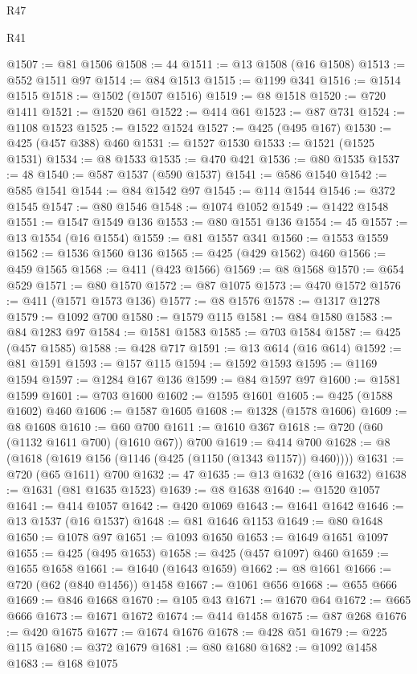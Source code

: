 \begin{lexlean}{R47}
\begin{lexlean}{R41}
\begin{coremodule}
{{{{{{{{{{{{{{{{{{{{{{{{{{{{{{{{{{{{{{{{{{{{{{{{{{{{{{{{{{{{{{{{{{{{{{{{{{{{{{{{{{{{{{{@1507 := @81 @1506
@1508 := 44
@1511 := @13 @1508 (@16 @1508)
@1513 := @552 @1511 @97
@1514 := @84 @1513
@1515 := @1199 @341
@1516 := @1514 @1515
@1518 := @1502 (@1507 @1516)
@1519 := @8 @1518
@1520 := @720 @1411
@1521 := @1520 @61
@1522 := @414 @61
@1523 := @87 @731
@1524 := @1108 @1523
@1525 := @1522 @1524
@1527 := @425 (@495 @167)
@1530 := @425 (@457 @388) @460
@1531 := @1527 @1530
@1533 := @1521 (@1525 @1531)
@1534 := @8 @1533
@1535 := @470 @421
@1536 := @80 @1535
@1537 := 48
@1540 := @587 @1537 (@590 @1537)
@1541 := @586 @1540
@1542 := @585 @1541
@1544 := @84 @1542 @97
@1545 := @114 @1544
@1546 := @372 @1545
@1547 := @80 @1546
@1548 := @1074 @1052
@1549 := @1422 @1548
@1551 := @1547 @1549 @136
@1553 := @80 @1551 @136
@1554 := 45
@1557 := @13 @1554 (@16 @1554)
@1559 := @81 @1557 @341
@1560 := @1553 @1559
@1562 := @1536 @1560 @136
@1565 := @425 (@429 @1562) @460
@1566 := @459 @1565
@1568 := @411 (@423 @1566)
@1569 := @8 @1568
@1570 := @654 @529
@1571 := @80 @1570
@1572 := @87 @1075
@1573 := @470 @1572
@1576 := @411 (@1571 @1573 @136)
@1577 := @8 @1576
@1578 := @1317 @1278
@1579 := @1092 @700
@1580 := @1579 @115
@1581 := @84 @1580
@1583 := @84 @1283 @97
@1584 := @1581 @1583
@1585 := @703 @1584
@1587 := @425 (@457 @1585)
@1588 := @428 @717
@1591 := @13 @614 (@16 @614)
@1592 := @81 @1591
@1593 := @157 @115
@1594 := @1592 @1593
@1595 := @1169 @1594
@1597 := @1284 @167 @136
@1599 := @84 @1597 @97
@1600 := @1581 @1599
@1601 := @703 @1600
@1602 := @1595 @1601
@1605 := @425 (@1588 @1602) @460
@1606 := @1587 @1605
@1608 := @1328 (@1578 @1606)
@1609 := @8 @1608
@1610 := @60 @700
@1611 := @1610 @367
@1618 := @720 (@60 (@1132 @1611 @700) (@1610 @67)) @700
@1619 := @414 @700
@1628 := @8 (@1618 (@1619 @156 (@1146 (@425 (@1150 (@1343 @1157)) @460))))
@1631 := @720 (@65 @1611) @700
@1632 := 47
@1635 := @13 @1632 (@16 @1632)
@1638 := @1631 (@81 @1635 @1523)
@1639 := @8 @1638
@1640 := @1520 @1057
@1641 := @414 @1057
@1642 := @420 @1069
@1643 := @1641 @1642
@1646 := @13 @1537 (@16 @1537)
@1648 := @81 @1646 @1153
@1649 := @80 @1648
@1650 := @1078 @97
@1651 := @1093 @1650
@1653 := @1649 @1651 @1097
@1655 := @425 (@495 @1653)
@1658 := @425 (@457 @1097) @460
@1659 := @1655 @1658
@1661 := @1640 (@1643 @1659)
@1662 := @8 @1661
@1666 := @720 (@62 (@840 @1456)) @1458
@1667 := @1061 @656
@1668 := @655 @666
@1669 := @846 @1668
@1670 := @105 @43
@1671 := @1670 @64
@1672 := @665 @666
@1673 := @1671 @1672
@1674 := @414 @1458
@1675 := @87 @268
@1676 := @420 @1675
@1677 := @1674 @1676
@1678 := @428 @51
@1679 := @225 @115
@1680 := @372 @1679
@1681 := @80 @1680
@1682 := @1092 @1458
@1683 := @168 @1075
}}}}}}}}}}}}}}}}}}}}}}}}}}}}}}}}}}}}}}}}}}}}}}}}}}}}}}}}}}}}}}}}}}}}}}}}}}}}}}}}}}}}}}}
\end{coremodule}
\end{lexlean}
\end{lexlean}
